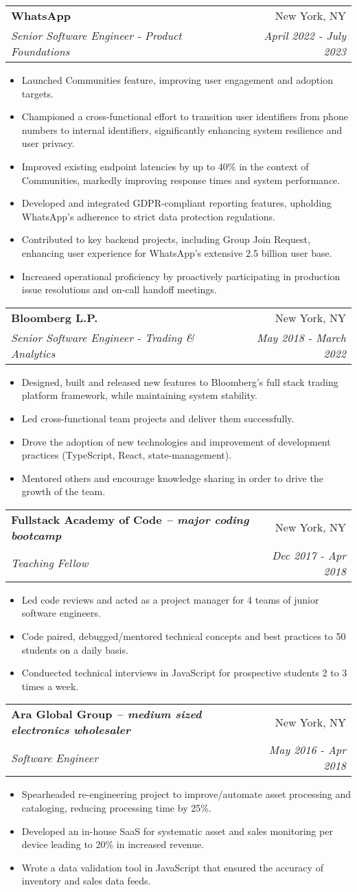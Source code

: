 \documentclass[letterpaper,10pt]{article}
\makeatletter
\newcommand{\resumeItemSimple}[1]{
  \item\small{
    {#1}{\vspace{-2pt}}
  }
}
\newcommand{\resumeSubheading}[4]{
  \vspace{-1pt}\item
    \begin{tabular*}{0.97\textwidth}{l@{\extracolsep{\fill}}r}
      \textbf{#1} & #2 \\
      \textit{\small#3} & \textit{\small #4} \\
    \end{tabular*}\vspace{-5pt}
}
\newcommand{\resumeItemListStart}{\begin{itemize}}
\newcommand{\resumeItemListEnd}{\end{itemize}\vspace{-5pt}}
\newcommand{\engineerType}{Software Engineer}
\makeatother
\begin{document}
    \resumeSubheading
      {WhatsApp}{New York, NY}
      {Senior Software Engineer - Product Foundations}{April 2022 - July 2023}
      \resumeItemListStart
        \resumeItemSimple{Launched Communities feature, improving user engagement and adoption targets.}
        \resumeItemSimple{Championed a cross-functional effort to transition user identifiers from phone numbers to internal identifiers, significantly enhancing system resilience and user privacy.}
        \resumeItemSimple{Improved existing endpoint latencies by up to 40\% in the context of Communities, markedly improving response times and system performance.}
        \resumeItemSimple{Developed and integrated GDPR-compliant reporting features, upholding WhatsApp's adherence to strict data protection regulations.}
        \resumeItemSimple{Contributed to key backend projects, including Group Join Request, enhancing user experience for WhatsApp's extensive 2.5 billion user base.}
        \resumeItemSimple{Increased operational proficiency by proactively participating in production issue resolutions and on-call handoff meetings.}
      \resumeItemListEnd

    \resumeSubheading
      {Bloomberg L.P.}{New York, NY}
      {Senior Software Engineer - Trading \& Analytics}{May 2018 - March 2022}
      \resumeItemListStart
        \resumeItemSimple{Designed, built and released new features to Bloomberg's full stack trading platform framework, while maintaining system stability.}
        \resumeItemSimple{Led cross-functional team projects and deliver them successfully.}
        \resumeItemSimple{Drove the adoption of new technologies and improvement of development practices (TypeScript, React, state-management).}
        \resumeItemSimple{Mentored others and encourage knowledge sharing in order to drive the growth of the team.}
      \resumeItemListEnd

    \resumeSubheading
      {Fullstack Academy of Code \normalfont\textit{-- major coding bootcamp}}{New York, NY}
      {Teaching Fellow}{Dec 2017 - Apr 2018}
      \resumeItemListStart
        \resumeItemSimple{Led code reviews and acted as a project manager for 4 teams of junior software engineers.}
        \resumeItemSimple{Code paired, debugged/mentored technical concepts and best practices to 50 students on a daily basis.}
        \resumeItemSimple{Conduected technical interviews in JavaScript for prospective students 2 to 3 times a week.}
      \resumeItemListEnd

    \resumeSubheading
      {Ara Global Group \normalfont\textit{-- medium sized electronics wholesaler}}{New York, NY}
      {\engineerType{}}{May 2016 - Apr 2018}
      \resumeItemListStart
      	\resumeItemSimple{Spearheaded re-engineering project to improve/automate asset processing and  cataloging, reducing processing time by 25\%.}
        \resumeItemSimple{Developed an in-house SaaS for systematic asset and sales monitoring per device leading to 20\% in increased revenue.}
        \resumeItemSimple{Wrote a data validation tool in JavaScript that ensured the accuracy of inventory and sales data feeds.}
      \resumeItemListEnd
\end{document}
